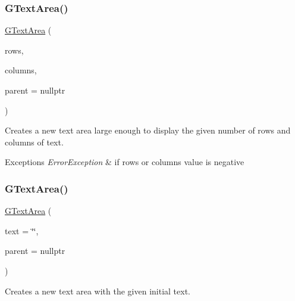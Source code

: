 \subsubsection{\texorpdfstring{G\+Text\+Area()}{GTextArea()}\hspace{0.1cm}{\footnotesize\ttfamily [1/2]}}
{\footnotesize\ttfamily \mbox{\hyperlink{classsgl_1_1GTextArea}{G\+Text\+Area}} (\begin{DoxyParamCaption}\item[{int}]{rows,  }\item[{int}]{columns,  }\item[{Q\+Widget $\ast$}]{parent = {\ttfamily nullptr} }\end{DoxyParamCaption})}



Creates a new text area large enough to display the given number of rows and columns of text. 


\begin{DoxyExceptions}{Exceptions}
{\em Error\+Exception} & if rows or columns value is negative \\
\hline
\end{DoxyExceptions}
\mbox{\label{classsgl_1_1GTextArea_a0902cdcc62cad5c1c81fc74ce38d8b13}} 
\subsubsection{\texorpdfstring{G\+Text\+Area()}{GTextArea()}\hspace{0.1cm}{\footnotesize\ttfamily [2/2]}}
{\footnotesize\ttfamily \mbox{\hyperlink{classsgl_1_1GTextArea}{G\+Text\+Area}} (\begin{DoxyParamCaption}\item[{const std\+::string \&}]{text = {\ttfamily \char`\"{}\char`\"{}},  }\item[{Q\+Widget $\ast$}]{parent = {\ttfamily nullptr} }\end{DoxyParamCaption})}



Creates a new text area with the given initial text. 

\mbox{\label{classsgl_1_1GTextArea_a7175406f7376c3e97ea921a39c175daf}} 
